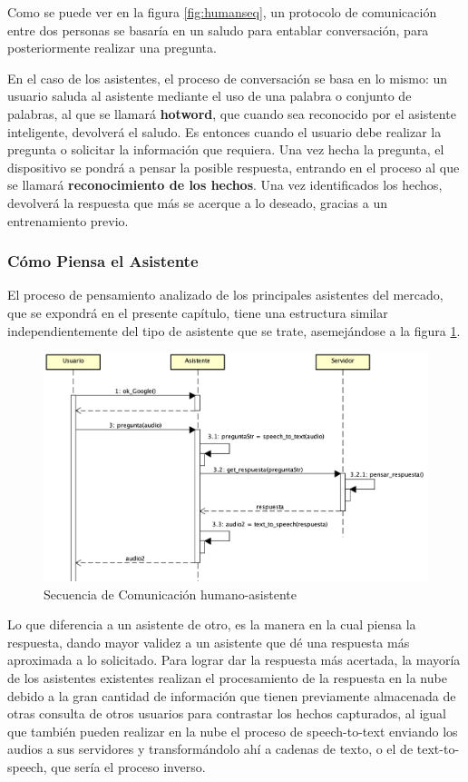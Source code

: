 Como se puede ver en la figura \ref{fig:humanseq}, un protocolo de comunicación entre dos personas se basaría en un saludo para entablar conversación, para posteriormente realizar una pregunta.

En el caso de los asistentes, el proceso de conversación se basa en lo mismo: un usuario saluda al asistente mediante el uso de una palabra o conjunto de palabras, al que se llamará \textbf{hotword}, que cuando sea reconocido por el asistente inteligente, devolverá el saludo.
Es entonces cuando el usuario debe realizar la pregunta o solicitar la información que requiera.
Una vez hecha la pregunta, el dispositivo se pondrá a pensar la posible respuesta, entrando en el proceso al que se llamará \textbf{reconocimiento de los hechos}. Una vez identificados los hechos, devolverá la respuesta que más se acerque a lo deseado, gracias a un entrenamiento previo.

\newpage
\subsubsection{Cómo Piensa el Asistente}

El proceso de pensamiento analizado de los principales asistentes del mercado, que se expondrá en el presente capítulo, tiene una estructura similar independientemente del tipo de asistente que se trate, asemejándose a la figura \ref{fig:humasseq}.

\begin{figure}[h!]
    \centering
    \includegraphics[width=13cm]{./img/sequence/humasseq.png}
    \caption{Secuencia de Comunicación humano-asistente}
    \label{fig:humasseq}
\end{figure}

Lo que diferencia a un asistente de otro, es la manera en la cual piensa la respuesta, dando mayor validez a un asistente que dé una respuesta más aproximada a lo solicitado.
Para lograr dar la respuesta más acertada, la mayoría de los asistentes existentes realizan el procesamiento de la respuesta en la nube debido a la gran cantidad de información que tienen previamente almacenada de otras consulta de otros usuarios para contrastar los hechos capturados, al igual que también pueden realizar en la nube el proceso de speech-to-text enviando los audios a sus servidores y transformándolo ahí a cadenas de texto, o el de text-to-speech, que sería el proceso inverso.

